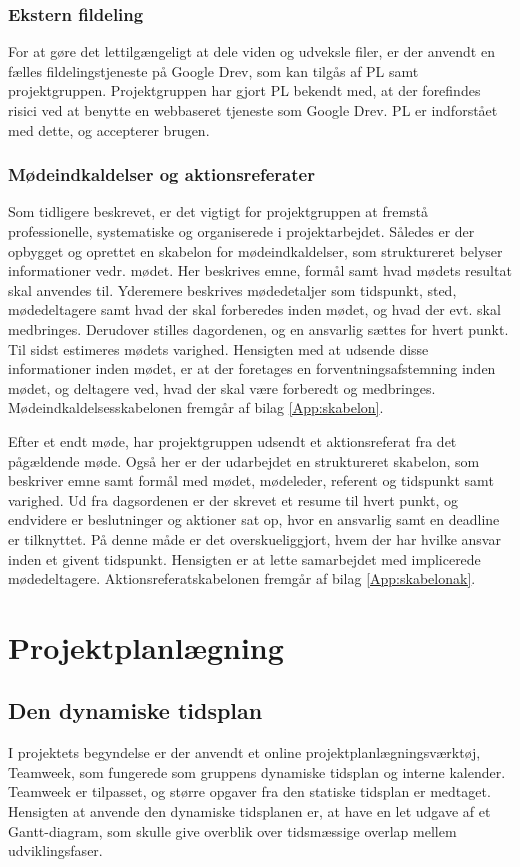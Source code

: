 	\subsubsection{Ekstern fildeling}
	For at gøre det lettilgængeligt at dele viden og udveksle filer, er der anvendt en fælles fildelingstjeneste på Google Drev, som kan tilgås af PL samt projektgruppen.  
	Projektgruppen har gjort PL bekendt med, at der forefindes risici ved at benytte en webbaseret tjeneste som Google Drev. PL er indforstået med dette, og accepterer brugen.
	 
	\subsubsection{Mødeindkaldelser og aktionsreferater}
	Som tidligere beskrevet, er det vigtigt for projektgruppen at fremstå professionelle, systematiske og organiserede i projektarbejdet. Således er der opbygget og oprettet en skabelon for mødeindkaldelser, som struktureret belyser informationer vedr. mødet. Her beskrives emne, formål samt hvad mødets resultat skal anvendes til. Yderemere beskrives mødedetaljer som tidspunkt, sted, mødedeltagere samt hvad der skal forberedes inden mødet, og hvad der evt. skal medbringes. Derudover stilles dagordenen, og en ansvarlig sættes for hvert punkt. Til sidst estimeres mødets varighed. Hensigten med at udsende disse informationer inden mødet, er at der foretages en forventningsafstemning inden mødet, og deltagere ved, hvad der skal være forberedt og medbringes. Mødeindkaldelsesskabelonen fremgår af bilag \ref{App:skabelon}.  
	
	Efter et endt møde, har projektgruppen udsendt et aktionsreferat fra det pågældende møde. Også her er der udarbejdet en struktureret skabelon, som beskriver emne samt formål med mødet, mødeleder, referent og tidspunkt samt varighed. Ud fra dagsordenen er der skrevet et resume til hvert punkt, og endvidere er beslutninger og aktioner sat op, hvor en ansvarlig samt en deadline er tilknyttet. På denne måde er det overskueliggjort, hvem der har hvilke ansvar inden et givent tidspunkt. Hensigten er at lette samarbejdet med implicerede mødedeltagere. Aktionsreferatskabelonen fremgår af bilag \ref{App:skabelonak}.        
	
\section{Projektplanlægning}  
\subsection{Den dynamiske tidsplan} 
I projektets begyndelse er der anvendt et online projektplanlægningsværktøj, Teamweek, som fungerede som gruppens dynamiske tidsplan og interne kalender. Teamweek er tilpasset, og større opgaver fra den statiske tidsplan er medtaget. Hensigten at anvende den dynamiske tidsplanen er, at have en let udgave af et Gantt-diagram, som skulle give overblik over tidsmæssige overlap mellem udviklingsfaser. 

